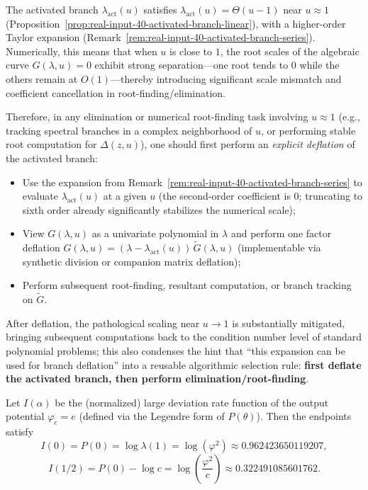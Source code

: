 \begin{remark}\label{rem:real-input-40-deflate-activated-branch}
The activated branch \(\lambda_{\mathrm{act}}(u)\) satisfies \(\lambda_{\mathrm{act}}(u)=\Theta(u-1)\) near \(u\approx 1\) (Proposition~\ref{prop:real-input-40-activated-branch-linear}), with a higher-order Taylor expansion (Remark~\ref{rem:real-input-40-activated-branch-series}).
Numerically, this means that when \(u\) is close to \(1\), the root scales of the algebraic curve \(G(\lambda,u)=0\) exhibit strong separation---one root tends to \(0\) while the others remain at \(O(1)\)---thereby introducing significant scale mismatch and coefficient cancellation in root-finding/elimination.
\par
\noindent Therefore, in any elimination or numerical root-finding task involving \(u\approx 1\) (e.g., tracking spectral branches in a complex neighborhood of \(u\), or performing stable root computation for \(\Delta(z,u)\)), one should first perform an \emph{explicit deflation} of the activated branch:
\begin{itemize}
  \item Use the expansion from Remark~\ref{rem:real-input-40-activated-branch-series} to evaluate \(\lambda_{\mathrm{act}}(u)\) at a given \(u\) (the second-order coefficient is \(0\); truncating to sixth order already significantly stabilizes the numerical scale);
  \item View \(G(\lambda,u)\) as a univariate polynomial in \(\lambda\) and perform one factor deflation
  \(
  G(\lambda,u)=(\lambda-\lambda_{\mathrm{act}}(u))\,\widetilde G(\lambda,u)
  \)
  (implementable via synthetic division or companion matrix deflation);
  \item Perform subsequent root-finding, resultant computation, or branch tracking on \(\widetilde G\).
\end{itemize}
After deflation, the pathological scaling near \(u\to 1\) is substantially mitigated, bringing subsequent computations back to the condition number level of standard polynomial problems; this also condenses the hint that ``this expansion can be used for branch deflation'' into a reusable algorithmic selection rule: \textbf{first deflate the activated branch, then perform elimination/root-finding}.
\end{remark}

\begin{corollary}\label{cor:real-input-40-rate-endpoints}
Let $I(\alpha)$ be the (normalized) large deviation rate function of the output potential $\varphi_e=e$ (defined via the Legendre form of $P(\theta)$). Then the endpoints satisfy
\[
I(0)=P(0)=\log\lambda(1)=\log(\varphi^2)\approx 0.962423650119207,
\]
\[
I(1/2)=P(0)-\log c=\log\!\left(\frac{\varphi^2}{c}\right)\approx 0.322491085601762.
\]
\end{corollary}

